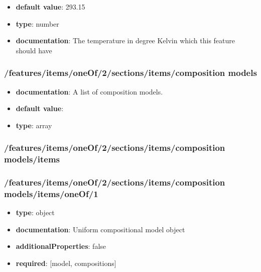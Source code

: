 \begin{itemize}\item {\bf default value}: 293.15
\item {\bf type}: number
\item {\bf documentation}: The temperature in degree Kelvin which this feature should have
\end{itemize}\subsubsection{/features/items/oneOf/2/sections/items/composition models}
\begin{itemize}\item {\bf documentation}: A list of composition models.
\item {\bf default value}: 
\item {\bf type}: array
\end{itemize}\subsubsection{/features/items/oneOf/2/sections/items/composition models/items}

\subsubsection{/features/items/oneOf/2/sections/items/composition models/items/oneOf/1}
\begin{itemize}\item {\bf type}: object
\item {\bf documentation}: Uniform compositional model object
\item {\bf additionalProperties}: false
\item {\bf required}: [model, compositions]\end{itemize}
